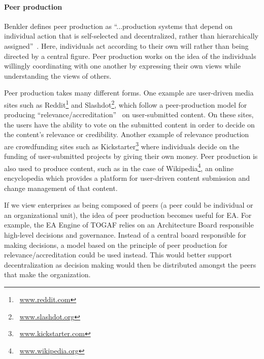 %
%

\paragraph*{Peer production}

Benkler defines peer production as ``...production systems that depend on individual action that is self-selected and decentralized, rather than hierarchically assigned''~\cite{benkler2006wealth}. Here, individuals act according to their own will rather than being directed by a central figure. Peer production works on the idea of the individuals willingly coordinating with one another by expressing their own views while understanding the views of others.

%
%

Peer production takes many different forms. One example are user-driven media sites such as Reddit\footnote{~\url{www.reddit.com}} and Slashdot\footnote{~\url{www.slashdot.org}}, which follow a peer-production model for producing ``relevance/accreditation''~\cite{benkler2006wealth} on user-submitted content. On these sites, the users have the ability to vote on the submitted content in order to decide on the content's relevance or credibility. Another example of relevance production are crowdfunding sites such as Kickstarter\footnote{~\url{www.kickstarter.com}} where individuals decide on the funding of user-submitted projects by giving their own money. Peer production is also used to produce content, such as in the case of Wikipedia\footnote{~\url{www.wikipedia.org}}, an online encyclopedia which provides a platform for user-driven content submission and change management of that content.

%
%

If we view enterprises as being composed of peers (a peer could be individual or an organizational unit), the idea of peer production becomes useful for EA. For example, the EA  Engine of TOGAF relies on an Architecture Board responsible high-level decisions and governance. Instead of a central board responsible for making decisions, a model based on the principle of peer production for relevance/accreditation could be used instead. This would better support decentralization as decision making would then be distributed amongst the peers that make the organization.


